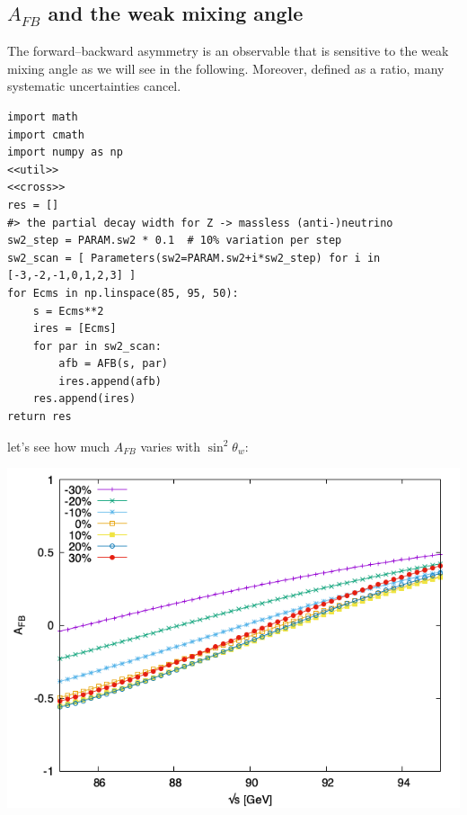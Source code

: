 \documentclass[11pt]{article}
\begin{document}
\subsection{\(A_{FB}\) and the weak mixing angle}
\label{sec:org06aa4c6}
The forward--backward asymmetry is an observable that is sensitive to the weak mixing angle as we will see in the following.
Moreover, defined as a ratio, many systematic uncertainties cancel.
\begin{verbatim}
import math
import cmath
import numpy as np
<<util>>
<<cross>>
res = []
#> the partial decay width for Z -> massless (anti-)neutrino
sw2_step = PARAM.sw2 * 0.1  # 10% variation per step
sw2_scan = [ Parameters(sw2=PARAM.sw2+i*sw2_step) for i in [-3,-2,-1,0,1,2,3] ]
for Ecms in np.linspace(85, 95, 50):
    s = Ecms**2
    ires = [Ecms]
    for par in sw2_scan:
        afb = AFB(s, par)
        ires.append(afb)
    res.append(ires)
return res
\end{verbatim}
let's see how much \(A_{FB}\) varies with \(\sin^2\theta_w\):
\begin{center}
\includegraphics[width=.9\linewidth]{sw_var.png}
\end{center}
\end{document}
